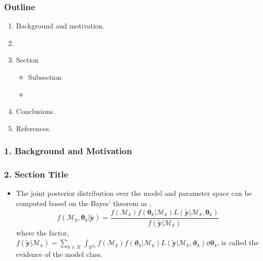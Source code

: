 
\begin{frame}\frametitle{Outline}
\begin{enumerate}
\item Background and motivation.
\item 
\item Section
 \begin{itemize}
  \item Subsection
  \item 
 \end{itemize}
\item Conclusions.
\item References.
\end{enumerate}
\end{frame}

 
\begin{frame}\frametitle{1. Background and Motivation}
 \lipsum[1]
\end{frame} 

\begin{frame} 
 \vspace*{2.0cm}
   \lipsum[1]
\end{frame} 
  
 
 
\begin{frame}\frametitle{2. Section Title}
 \lipsum[1]
\end{frame}
 
\begin{frame}
\vspace*{2.0cm}
\begin{itemize}
 \item The joint posterior distribution over the model and parameter space can be computed based on the Bayes' theorem as \cite{fan_and_sisson_2011},
 \vspace{0.51cm}
 \begin{equation}\label{eq:posterior_models_params}
  f(\mathcal{M}_k, \boldsymbol{\theta}_{k}| \tilde{\mathbf{y}}) = \frac{f(\mathcal{M}_k)f(\boldsymbol{\theta}_{k} | \mathcal{M}_k)L(\tilde{\mathbf{y}} | \mathcal{M}_k, \boldsymbol{\theta}_{k})}{f\left(\tilde{\mathbf{y}}| \mathcal{M}_k\right)}
 \end{equation}
 \vspace{0.5cm}
 where the factor, $f\left(\tilde{\mathbf{y}}| \mathcal{M}_k\right) =\sum_{k\in\mathcal{K}} \int_{\mathbb{R}^{n_k}} f(\mathcal{M}_k) f(\boldsymbol{\vartheta}_{k} | \mathcal{M}_k) L(\tilde{\mathbf{y}} | \mathcal{M}_k, \boldsymbol{\vartheta}_{k}) \dd \boldsymbol{\vartheta}_{k}$, is called the evidence of the model class.
\end{itemize}
\end{frame}
 
